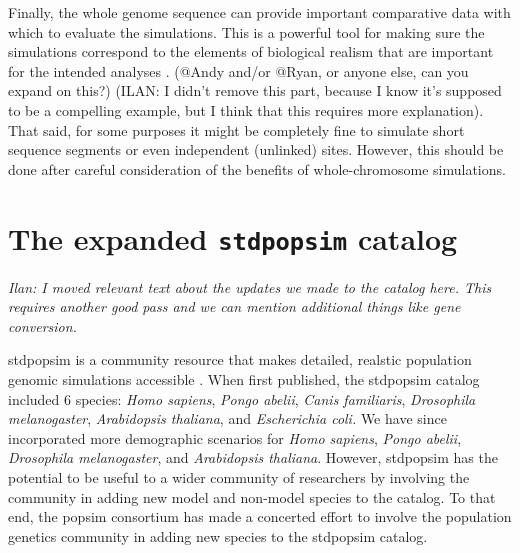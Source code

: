 \documentclass[hidelinks]{article}
\begin{document}
Finally, the whole genome sequence can provide important comparative
data with which to evaluate the simulations. This is a powerful tool for
making sure the simulations correspond to the elements of biological
realism that are important for the intended analyses \citep{Hsieh2016a}. 
(@Andy and/or @Ryan, or anyone else, can you expand on this?)
(ILAN: I didn't remove this part, because I know it's supposed to be a compelling example,
but I think that this requires more explanation).
%
That said, for some purposes it might be completely fine to simulate short sequence
segments or even independent (unlinked) sites. However, this should be done after
careful consideration  of the benefits of whole-chromosome simulations.


%

\hypertarget{sec3}{%
	\section*{The expanded \texttt{stdpopsim} catalog}\label{sec:expanded-catalog}}

\noindent\emph{Ilan: I moved relevant text about the updates we made to the catalog here.
	This requires another good pass and we can mention additional things like
	gene conversion.\vspace{5pt}}

stdpopsim is a community resource that makes detailed, realstic
population genomic simulations accessible \citep{Adrion2020}. When first
published, the stdpopsim catalog included 6 species: \emph{Homo
	sapiens}, \emph{Pongo abelii}, \emph{Canis familiaris}, \emph{Drosophila
	melanogaster}, \emph{Arabidopsis thaliana}, and \emph{Escherichia coli.}
We have since incorporated more demographic scenarios for \emph{Homo sapiens},
\emph{Pongo abelii}, \emph{Drosophila melanogaster}, and
\emph{Arabidopsis thaliana}. However, stdpopsim has the potential to be
useful to a wider community of researchers by involving the community
in adding new model and non-model species to the catalog.
To that end, the popsim consortium has made a concerted effort to 
involve the population genetics community in adding new species 
to the stdpopsim catalog.
\end{document}
